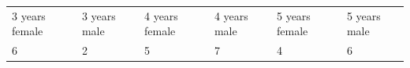 \begin{enumerate}[noitemsep, label=\textbf{\arabic*}. ]
{\begin{center}
\begin{xtabular*}{\mytablewidth}[t]{|p{10\mystarwidth}|p{10\mystarwidth}|p{10\mystarwidth}|p{10\mystarwidth}|p{10\mystarwidth}|p{10\mystarwidth}|}
        3 years
female &
        3 years male &
        4 years female &
        4
years male &
        5 years female &
        5 years male%
     \tabularnewline{}
        6 &
        2 &
        5 &
        7 &
        4 &
        6%
     \tabularnewline{}

\end{xtabular*}
\end{center}}
\end{enumerate}
